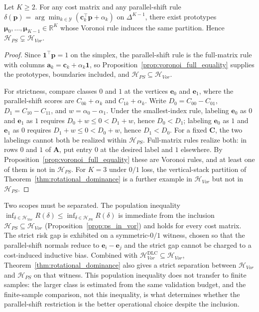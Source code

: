 \begin{proposition}\label{prop:ps_in_vor}
    Let $K \geq 2$. For any cost matrix and any parallel-shift rule $\delta(\mathbf{p}) = \arg\min_{k \in \mathcal{Y}} (\mathbf{c}_k^\top \mathbf{p} + \alpha_k)$ on $\Delta^{K-1}$, there exist prototypes $\boldsymbol{\mu}_0, \ldots, \boldsymbol{\mu}_{K-1} \in \mathbb{R}^K$ whose Voronoi rule induces the same partition. Hence $\mathcal{H}_{PS} \subsetneq \mathcal{H}_{Vor}$.
\end{proposition}

\begin{proof}
    Since $\mathbf{1}^\top \mathbf{p} = 1$ on the simplex, the parallel-shift rule is the full-matrix rule with columns $\mathbf{a}_k = \mathbf{c}_k + \alpha_k \mathbf{1}$, so Proposition~\ref{prop:voronoi_full_equality} supplies the prototypes, boundaries included, and $\mathcal{H}_{PS} \subseteq \mathcal{H}_{Vor}$.

    For strictness, compare classes $0$ and $1$ at the vertices $\mathbf{e}_0$ and $\mathbf{e}_1$, where the parallel-shift scores are $C_{0k} + \alpha_k$ and $C_{1k} + \alpha_k$. Write $D_0 = C_{00} - C_{01}$, $D_1 = C_{10} - C_{11}$, and $w = \alpha_0 - \alpha_1$. Under the smallest-index rule, labeling $\mathbf{e}_0$ as $0$ and $\mathbf{e}_1$ as $1$ requires $D_0 + w \leq 0 < D_1 + w$, hence $D_0 < D_1$; labeling $\mathbf{e}_0$ as $1$ and $\mathbf{e}_1$ as $0$ requires $D_1 + w \leq 0 < D_0 + w$, hence $D_1 < D_0$. For a fixed $\mathbf{C}$, the two labelings cannot both be realized within $\mathcal{H}_{PS}$. Full-matrix rules realize both: in rows $0$ and $1$ of $\mathbf{A}$, put entry $0$ at the desired label and $1$ elsewhere. By Proposition~\ref{prop:voronoi_full_equality} these are Voronoi rules, and at least one of them is not in $\mathcal{H}_{PS}$. For $K = 3$ under $0/1$ loss, the vertical-stack partition of Theorem~\ref{thm:rotational_dominance} is a further example in $\mathcal{H}_{Vor}$ but not in $\mathcal{H}_{PS}$.
\end{proof}

Two scopes must be separated. The population inequality $\inf_{\delta \in \mathcal{H}_{Vor}} R(\delta) \leq \inf_{\delta \in \mathcal{H}_{PS}} R(\delta)$ is immediate from the inclusion $\mathcal{H}_{PS} \subseteq \mathcal{H}_{Vor}$ (Proposition~\ref{prop:ps_in_vor}) and holds for every cost matrix. The strict risk gap is exhibited on a symmetric-$0/1$ witness, chosen so that the parallel-shift normals reduce to $\mathbf{e}_i - \mathbf{e}_j$ and the strict gap cannot be charged to a cost-induced inductive bias. Combined with $\mathcal{H}_{Vor}^{\mathrm{DLC}} \subseteq \mathcal{H}_{Vor}$, Theorem~\ref{thm:rotational_dominance} also gives a strict separation between $\mathcal{H}_{Vor}$ and $\mathcal{H}_{PS}$ on that witness. This population inequality does not transfer to finite samples: the larger class is estimated from the same validation budget, and the finite-sample comparison, not this inequality, is what determines whether the parallel-shift restriction is the better operational choice despite the inclusion.

